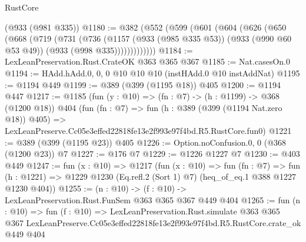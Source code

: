 \begin{lexlean}{RustCore}
\begin{coremodule}
    (@933 (@981 @335))
@1180 := @382
    (@552
      (@599
        (@601
          (@604
            (@626
              (@650
                (@668
                  (@719
                    (@731
                      (@736
                        (@1157
                          (@933 (@985 @335 @53))
                          (@933 (@990 @60 @53 @49))
                          (@933 (@998 @335)))))))))))))
@1184 := LexLeanPreservation.Rust.CrateOK @363 @365 @367
@1185 := Nat.casesOn.{0}
@1194 := HAdd.hAdd.{0, 0, 0} @10 @10 @10 (instHAdd.{0} @10 instAddNat)
@1195 := @1194 @449
@1199 := @389 (@399 (@1195 @18)) @405
@1200 := @1194 @447
@1217 := @1185
    (fun (y : @10) => (fn : @7) -> (h : @1199) -> @368 (@1200 @18))
    @404
    (fun (fn : @7) =>
    fun (h : @389 (@399 (@1194 Nat.zero @18)) @405) =>
    LexLeanPreserve.Cc05e3effed22818fe13e2f993e97f4bd.R5.RustCore.fun0)
@1221 := @389 (@399 (@1195 @23)) @405
@1226 := Option.noConfusion.{0, 0} (@368 (@1200 @23)) @7
@1227 := @176 @7
@1229 := @1226 @1227 @7
@1230 := @403 @449
@1247 := fun (x : @10) =>
  @1217
    (fun (x : @10) =>
    fun (fn : @7) =>
    fun (h : @1221) => @1229 @1230 (Eq.refl.{2} (Sort 1) @7) (heq_of_eq.{1} @388 @1227 @1230 @404))
@1255 := (n : @10) -> (f : @10) -> LexLeanPreservation.Rust.FunSem @363 @365 @367 @449 @404
@1265 := fun (n : @10) =>
  fun (f : @10) =>
  LexLeanPreservation.Rust.simulate
    @363
    @365
    @367
    LexLeanPreserve.Cc05e3effed22818fe13e2f993e97f4bd.R5.RustCore.crate_ok
    @449
    @404
\end{coremodule}
\end{lexlean}
